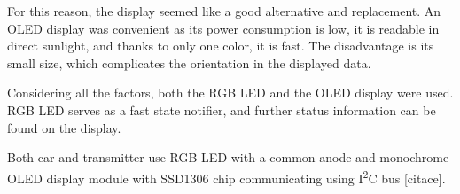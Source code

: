 For this reason, the display seemed like a good alternative and replacement. An OLED display was convenient as its power consumption is low, it is readable in direct sunlight, and thanks to only one color, it is fast. The disadvantage is its small size, which complicates the orientation in the displayed data.

Considering all the factors, both the RGB LED and the OLED display were used. RGB LED serves as a fast state notifier, and further status information can be found on the display.

Both car and transmitter use RGB LED with a common anode and monochrome OLED display module with SSD1306 chip communicating using I\textsuperscript{2}C bus [\todo citace].



